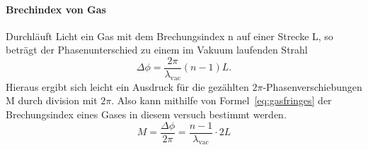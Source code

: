 \paragraph{Brechindex von Gas}
Durchläuft Licht ein Gas mit dem Brechungsindex n auf einer 
Strecke L, so beträgt der Phasenunterschied zu einem im Vakuum 
laufenden Strahl
\begin{equation}
\Delta\phi = \frac{2\pi}{\lambda_\text{vac}}(n-1)L.
\end{equation}
Hieraus ergibt sich leicht ein Ausdruck für die gezählten 
$2\pi$-Phasenverschiebungen M durch division mit $2\pi$.
Also kann mithilfe von Formel~\eqref{eq:gasfringes} der 
Brechungsindex eines Gases in diesem versuch bestimmt werden.
\begin{equation}
M = \frac{\Delta\phi}{2\pi} = \frac{n-1}{\lambda_\text{vac}}\cdot 2L
\label{eq:gasfringes}
\end{equation}